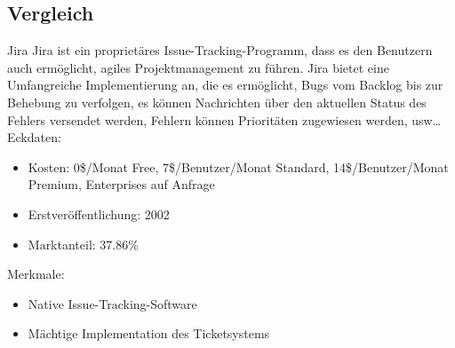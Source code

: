 \subsection{Vergleich}	
Jira
Jira ist ein proprietäres Issue-Tracking-Programm, dass es den Benutzern auch ermöglicht, agiles Projektmanagement zu führen. Jira bietet eine Umfangreiche Implementierung an, die es ermöglicht, Bugs vom Backlog bis zur Behebung zu verfolgen, es können Nachrichten über den aktuellen Status des Fehlers versendet werden, Fehlern können Prioritäten zugewiesen werden, usw…		
Eckdaten:
\begin{itemize}
	\item Kosten: 0\$/Monat Free, 7\$/Benutzer/Monat Standard, 14\$/Benutzer/Monat Premium, Enterprises auf Anfrage
	\item Erstveröffentlichung: 2002
	\item Marktanteil: 37.86\%
\end{itemize}				
Merkmale:
\begin{itemize}
	\item Native Issue-Tracking-Software
	\item Mächtige Implementation des Ticketsystems
\end{itemize}				
				
